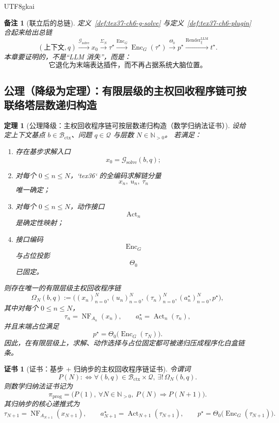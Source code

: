 \documentclass[12pt]{article}
\newtheorem{theorem}{定理}[section]
\newtheorem{remark}{备注}[section]
\newtheorem{Certificate}{证书}[section]
\newcommand{\Render}{\operatorname{Render}}
\begin{document}
\begin{CJK*}{UTF8}{gkai}
\begin{remark}[联立后的总链]
定义~\ref{def:tex37-ch6-g-solve} 与定义~\ref{def:tex37-ch6-plugin} 合起来给出总链
\[
  (\text{上下文},q)
  \xrightarrow{\mathcal{G}_{\mathrm{solve}}}
  x_0
  \xrightarrow{\Sigma_N}
  \tau^\star
  \xrightarrow{\operatorname{Enc}_G}
  \operatorname{Enc}_G(\tau^\star)
  \xrightarrow{\Theta_0}
  p^\star
  \xrightarrow{\Render^{\mathrm{LLM}}_\xi}
  t^\star.
\]
本章要证明的，不是“LLM 消失”，而是：
\[
  \text{它退化为末端表达插件，而不再占据系统大脑位置。}
\]
\end{remark}

\subsection{公理（降级为定理）：有限层级的主权回收程序链可按联络塔层数递归构造}
\label{subsec:tex37-ch6-axiom-downgrade}

\begin{theorem}[公理降级：主权回收程序链可按层数递归构造（数学归纳法证书）]
\label{thm:tex37-ch6-program-chain}
设给定上下文基点 $b\in\mathcal{B}_{\mathrm{ctx}}$、问题 $q\in\mathcal{Q}$ 与层数 $N\in\mathbb{N}_{>0}$。
若满足：
\begin{enumerate}
  \item 存在基步求解入口
  \[
    x_0=\mathcal{G}_{\mathrm{solve}}(b,q);
  \]
  \item 对每个 $0\le n\le N$，`tex36` 的全编码求解链分量
  \[
    x_n,\ u_n,\ \tau_n
  \]
  唯一确定；
  \item 对每个 $0\le n\le N$，动作接口
  \[
    \operatorname{Act}_n
  \]
  是确定性映射；
  \item 接口编码
  \[
    \operatorname{Enc}_G
  \]
  与占位投影
  \[
    \Theta_0
  \]
  已固定。
\end{enumerate}
则存在唯一的有限层级主权回收程序链
\[
  \Omega_N(b,q)
  :=
  \bigl(
    (x_n)_{n=0}^{N},
    (u_n)_{n=0}^{N},
    (\tau_n)_{n=0}^{N},
    (a_n^\star)_{n=0}^{N},
    p^\star
  \bigr),
\]
其中对每个 $0\le n\le N$，
\[
  \tau_n=\operatorname{NF}_{A_n}(x_n),
  \qquad
  a_n^\star=\operatorname{Act}_n(\tau_n),
\]
并且末端占位满足
\[
  p^\star=\Theta_0\bigl(\operatorname{Enc}_G(\tau_N)\bigr).
\]
因此，在有限层级上，求解、动作选择与占位固定都可被递归压成程序化白盒链条。
\end{theorem}

\begin{Certificate}[证书：基步 + 归纳步的主权回收程序链证书]
\label{cert:tex37-ch6-program-chain}
令谓词
\[
  P(N)
  :
  \Longleftrightarrow
  \forall (b,q)\in \mathcal{B}_{\mathrm{ctx}}\times\mathcal{Q},\
  \exists!\,\Omega_N(b,q).
\]
则数学归纳法证书记为
\[
  \pi_{\mathrm{prog}}
  =
  \bigl(
    P(1),\
    \forall N\in\mathbb{N}_{>0},\ P(N)\Rightarrow P(N+1)
  \bigr).
\]
其归纳步的核心递推式为
\[
  \tau_{N+1}=\operatorname{NF}_{A_{N+1}}(x_{N+1}),
  \qquad
  a_{N+1}^\star=\operatorname{Act}_{N+1}(\tau_{N+1}),
  \qquad
  p^\star=\Theta_0\bigl(\operatorname{Enc}_G(\tau_{N+1})\bigr).
\]
\end{Certificate}


\end{CJK*}
\end{document}
